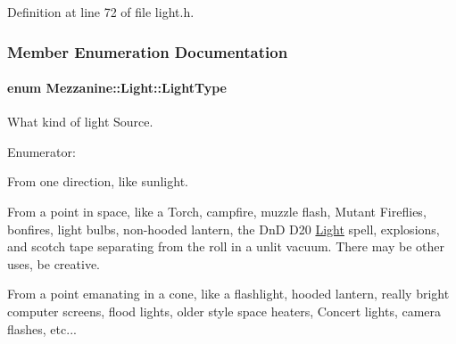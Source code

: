 Definition at line 72 of file light.h.



\subsubsection{Member Enumeration Documentation}
\hypertarget{classMezzanine_1_1Light_a783df27d8261c5af2226bc75586944be}{
\paragraph[{LightType}]{\setlength{\rightskip}{0pt plus 5cm}enum {\bf Mezzanine::Light::LightType}}\hfill}
\label{classMezzanine_1_1Light_a783df27d8261c5af2226bc75586944be}


What kind of light Source. 

\begin{Desc}
\item[Enumerator: ]\par
\begin{description}
\item[{\em 
\hypertarget{classMezzanine_1_1Light_a783df27d8261c5af2226bc75586944bea0374f1b4eee3903c6857838f0de8c48e}{
Directional}
\label{classMezzanine_1_1Light_a783df27d8261c5af2226bc75586944bea0374f1b4eee3903c6857838f0de8c48e}
}]From one direction, like sunlight. \item[{\em 
\hypertarget{classMezzanine_1_1Light_a783df27d8261c5af2226bc75586944bea8922c0c85b8c971b99e636ff924bfb5d}{
Point}
\label{classMezzanine_1_1Light_a783df27d8261c5af2226bc75586944bea8922c0c85b8c971b99e636ff924bfb5d}
}]From a point in space, like a Torch, campfire, muzzle flash, Mutant Fireflies, bonfires, light bulbs, non-\/hooded lantern, the DnD D20 \hyperlink{classMezzanine_1_1Light}{Light} spell, explosions, and scotch tape separating from the roll in a unlit vacuum. There may be other uses, be creative. \item[{\em 
\hypertarget{classMezzanine_1_1Light_a783df27d8261c5af2226bc75586944beab3af9a02884457e13f67d4bba11e4b4c}{
Spotlight}
\label{classMezzanine_1_1Light_a783df27d8261c5af2226bc75586944beab3af9a02884457e13f67d4bba11e4b4c}
}]From a point emanating in a cone, like a flashlight, hooded lantern, really bright computer screens, flood lights, older style space heaters, Concert lights, camera flashes, etc... \end{description}
\end{Desc}



